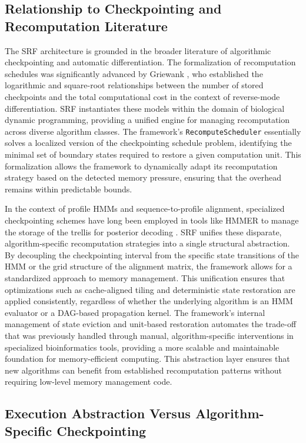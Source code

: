 \subsection{Relationship to Checkpointing and Recomputation Literature}

The SRF architecture is grounded in the broader literature of algorithmic checkpointing and automatic differentiation. The formalization of recomputation schedules was significantly advanced by Griewank \cite{Griewank1992, Griewank2000}, who established the logarithmic and square-root relationships between the number of stored checkpoints and the total computational cost in the context of reverse-mode differentiation. SRF instantiates these models within the domain of biological dynamic programming, providing a unified engine for managing recomputation across diverse algorithm classes. The framework's \texttt{RecomputeScheduler} essentially solves a localized version of the checkpointing schedule problem, identifying the minimal set of boundary states required to restore a given computation unit. This formalization allows the framework to dynamically adapt its recomputation strategy based on the detected memory pressure, ensuring that the overhead remains within predictable bounds.

In the context of profile HMMs and sequence-to-profile alignment, specialized checkpointing schemes have long been employed in tools like HMMER to manage the storage of the trellis for posterior decoding \cite{Eddy2011}. SRF unifies these disparate, algorithm-specific recomputation strategies into a single structural abstraction. By decoupling the checkpointing interval from the specific state transitions of the HMM or the grid structure of the alignment matrix, the framework allows for a standardized approach to memory management. This unification ensures that optimizations such as cache-aligned tiling and deterministic state restoration are applied consistently, regardless of whether the underlying algorithm is an HMM evaluator or a DAG-based propagation kernel. The framework's internal management of state eviction and unit-based restoration automates the trade-off that was previously handled through manual, algorithm-specific interventions in specialized bioinformatics tools, providing a more scalable and maintainable foundation for memory-efficient computing. This abstraction layer ensures that new algorithms can benefit from established recomputation patterns without requiring low-level memory management code.

\subsection{Execution Abstraction Versus Algorithm-Specific Checkpointing}

